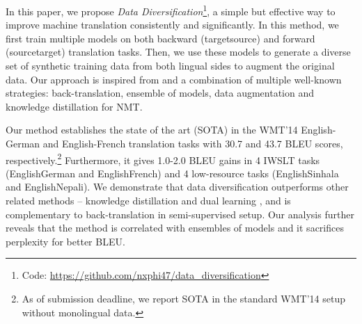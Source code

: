 \documentclass{article}
\begin{document}
In this paper, we propose \emph{Data Diversification}\footnote{Code: \href{https://github.com/nxphi47/data_diversification}{https://github.com/nxphi47/data\_diversification}}, a simple but effective way to improve machine translation consistently and significantly. In this method, we first train multiple models on both backward (targetsource) and forward (sourcetarget) translation tasks. Then, we use these models to generate a diverse set of synthetic training data from both lingual sides to augment the original data. Our approach is inspired from and a combination of multiple well-known strategies: back-translation, ensemble of models, data augmentation and knowledge distillation for NMT. 

Our method establishes the state of the art (SOTA) in the WMT'14 English-German and English-French translation tasks with 30.7 and 43.7 BLEU scores, respectively.\footnote{As of submission deadline, we report SOTA in the standard WMT'14 setup without monolingual data.} Furthermore, it gives 1.0-2.0 BLEU gains in 4 IWSLT tasks (EnglishGerman and EnglishFrench) and 4 low-resource tasks (EnglishSinhala and EnglishNepali). {We demonstrate that data diversification outperforms other related methods -- knowledge distillation \citep{knowledge_distill_kim_rush_2016} and dual learning \cite{multiagent}}, and is complementary to back-translation \citep{backtranslate_sennrich-etal-2016-improving} in semi-supervised setup. Our analysis further reveals that the method is correlated with ensembles of models and it sacrifices perplexity for better BLEU.





\begin{comment}
Data Augmentation for Low-Resource Neural Machine Translation
https://www.aclweb.org/anthology/P17-2090/

SwitchOut: an Efficient Data Augmentation Algorithm for Neural Machine Translation
https://www.aclweb.org/anthology/D18-1100/

Soft Contextual Data Augmentation for Neural Machine Translation
https://arxiv.org/pdf/1905.10523.pdf

Improving Neural Machine Translation Robustness via Data Augmentation: Beyond Back Translation
https://arxiv.org/pdf/1910.03009.pdf

UNSUPERVISED DATA AUGMENTATION FOR CONSISTENCY TRAINING
https://arxiv.org/pdf/1904.12848.pdf

QANet augmentation


Improving Neural Machine Translation Models with Monolingual Data
https://arxiv.org/pdf/1511.06709.pdf

On The Evaluation of Machine Translation Systems Trained With Back-Translation
https://arxiv.org/pdf/1908.05204.pdf

https://blog.statsbot.co/ensemble-learning-d1dcd548e936
\end{comment}
\end{document}
